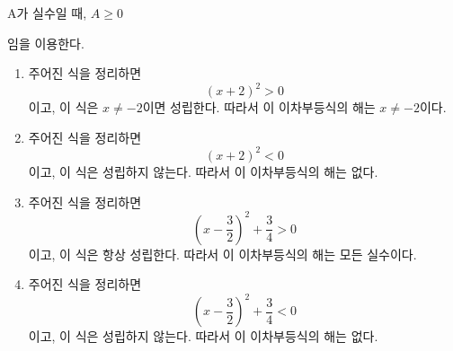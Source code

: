 \documentclass{oblivoir}
\begin{document}
\begin{mdframed}[frametitle=풀이1]
\begin{center}
A가 실수일 때, \(A\ge0\)
\end{center}
임을 이용한다.

\begin{enumerate}
\item
주어진 식을 정리하면 \[(x+2)^2>0\]이고, 이 식은 \(x\neq-2\)이면 성립한다.
따라서 이 이차부등식의 해는 \(x\neq-2\)이다.
\item
주어진 식을 정리하면 \[(x+2)^2<0\]이고, 이 식은 성립하지 않는다.
따라서 이 이차부등식의 해는 없다.
\item
주어진 식을 정리하면 \[\left(x-\frac32\right)^2+\frac34>0\]이고, 이 식은 항상 성립한다.
따라서 이 이차부등식의 해는 모든 실수이다.
\item
주어진 식을 정리하면 \[\left(x-\frac32\right)^2+\frac34<0\]이고, 이 식은 성립하지 않는다.
따라서 이 이차부등식의 해는 없다.
\end{enumerate}
\end{mdframed}
\end{document}

